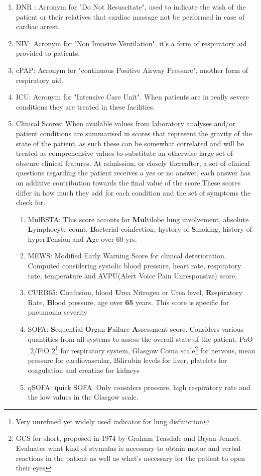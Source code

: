 \begin{enumerate}
\item DNR : Acronym for "Do Not Resuscitate", used to indicate the wish of the patient or their relatives that cardiac massage not be performed in case of cardiac arrest. 
\item NIV: Acronym for "Non Invasive Ventilation", it's a form of respiratory aid provided to patients.
\item cPAP: Acronym for  "continuous Positive Airway Pressure", another form of respiratory aid.
\item ICU: Acronym for "Intensive Care Unit". When patients are in really severe conditions they are treated in these facilities.
\item Clinical Scores: When available values from laboratory analyses and/or patient conditions are summarised in scores that represent the gravity of the state of the patient, as such these can be somewhat correlated and will be treated as comprehensive values to substitute an otherwise large set of obscure clinical features. At admission, or closely thereafter, a set of clinical questions regarding the patient receives a yes or no answer, each answer has an additive contribution towards the final value of the score.These scores differ in how much they add for each condition and the set of symptoms the check for.
	\begin{enumerate}
		\item MulBSTA: This score acconts for \textbf{Mul}tilobe lung involvement, absolute \textbf{L}ymphocyte count, \textbf{B}acterial coinfection, hystory of \textbf{S}moking, history of hyper\textbf{T}ension and \textbf{A}ge over 60 yrs. \cite{MulBSTA}
		\item MEWS: Modified Early Warning Score for clinical deterioration. Computed considering systolic blood pressure, heart rate, respiratory rate, temperature and AVPU(Alert Voice Pain Unresponsive) score. \cite{MEWS}
		\item CURB65: \textbf{C}onfusion, blood \textbf{U}rea Nitrogen or Urea level, \textbf{R}espiratory Rate, \textbf{B}lood pressure, age over \textbf{65} years. This score is specific for pneumonia severity \cite{CURB65}
		\item SOFA:  \textbf{S}equential  \textbf{O}rgan  \textbf{F}ailure  \textbf{A}ssessment score. Considers various quantities from all systems to assess the overall state of the patient, PaO$\_2$/FiO$\_2$\footnote{Very unrefined yet widely used indicator for lung disfunction} for respiratory system, Glasgow Coma scale\footnote{GCS for short, proposed in 1974 by Graham Teasdale and Bryan Jennet. Evaluates what kind of stymulus is necessary to obtain motor and verbal reactions in the patient as well as what's necessary for the patient to open their eyes} for nervous, mean pressure for cardiovascular, Bilirubin levels for liver, platelets for coagulation and creatine for kidneys \cite{SOFA}
		\item qSOFA:  \textbf{q}uick SOFA. Only considers pressure, high respiratory rate and the low values in the Glasgow scale.
	\end{enumerate}	
\end{enumerate}

